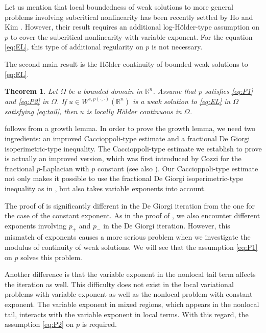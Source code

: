 \documentclass[11pt]{amsart}
\theoremstyle{plain}
\newtheorem{theorem}{Theorem}[section]
\theoremstyle{definition}
\numberwithin{equation}{section}
\begin{document}
Let us mention that local boundedness of weak solutions to more general problems involving subcritical nonlinearity has been recently settled by Ho and Kim \cite{HK19}. However, their result requires an additional log-H\"older-type assumption on $p$ to cover the subcritical nonlinearity with variable exponent. For the equation \eqref{eq:EL}, this type of additional regularity on $p$ is not necessary.

The second main result is the H\"older continuity of bounded weak solutions to \eqref{eq:EL}.

\begin{theorem} \label{thm:Holder}
Let $\Omega$ be a bounded domain in $\mathbb{R}^n$. Assume that $p$ satisfies \eqref{eq:P1} and \eqref{eq:P2} in $\Omega$. If $u \in W^{s, p(\cdot,\cdot)}(\mathbb{R}^n)$ is a weak solution to \eqref{eq:EL} in $\Omega$ satisfying \eqref{eq:tail}, then $u$ is locally H\"older continuous in $\Omega$.
\end{theorem}

 follows from a growth lemma. In order to prove the growth lemma, we need two ingredients: an improved Caccioppoli-type estimate and a fractional De Giorgi isoperimetric-type inequality. The Caccioppoli-type estimate we establish to prove  is actually an improved version, which was first introduced by Cozzi \cite{Coz17} for the fractional $p$-Laplacian with $p$ constant (see also \cite{CCV11}). Our Caccioppoli-type estimate not only makes it possible to use the fractional De Giorgi isoperimetric-type inequality as in \cite{Coz17}, but also takes variable exponents into account. 

The proof of  is significantly different in the De Giorgi iteration from the one for the case of the constant exponent. As in the proof of , we also encounter different exponents involving $p_+$ and $p_-$ in the De Giorgi iteration. However, this mismatch of exponents causes a more serious problem when we investigate the modulus of continuity of weak solutions. We will see that the assumption \eqref{eq:P1} on $p$ solves this problem. 

Another difference is that the variable exponent in the nonlocal tail term affects the iteration as well. This difficulty does not exist in the local variational problems with variable exponent as well as the nonlocal problem with constant exponent. The variable exponent in mixed regions, which appears in the nonlocal tail, interacts with the variable exponent in local terms. With this regard, the assumption \eqref{eq:P2} on $p$ is required.
\end{document}
